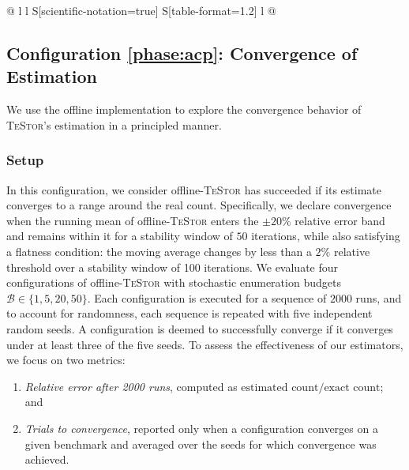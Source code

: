 \documentclass[acmsmall]{acmart}
\newcommand{\testor}{\textsc{TeStor}\xspace}
\begin{document}
\begin{table}[t]
\begin{tabular}{@{} l l S[scientific-notation=true] S[table-format=1.2] l @{}}
  \end{tabular}

  \vspace{0.1in}
  \caption{Synthetic benchmarks for estimator evaluation on \textbf{maximal executions}. Columns (left→right): benchmark info; estimator configuration; average relative error after 2000 trials; success ratio (fraction of 5 seeds that converge within the 80–120\% band); and average trials to converge across the successful seeds (reported only if success ratio$\geq 0.6$; otherwise shown as “failed”). }
    \label{tab:synthtic_converge}

\end{table}



\subsection{Configuration \ref{phase:acp}: Convergence of Estimation
}


We use the offline implementation to  explore the convergence behavior of \testor's estimation in a principled manner.

\subsubsection*{Setup}
In this configuration, we consider offline-\testor has succeeded if its estimate converges to a range around the real count. 
Specifically, we declare convergence when the running mean of offline-\testor enters the $\pm20\%$ relative error band and remains within it for a stability window of 
$50$ iterations, while also satisfying a flatness condition: the moving average changes by less than a $2\%$ relative threshold over a stability window of 100 iterations.
We evaluate four configurations of offline-\testor with stochastic enumeration budgets $\mathcal{B} \in \{1, 5, 20, 50\}$. 
Each configuration is executed for a sequence of $2000$ runs, and to account for randomness, each sequence is repeated with five independent random seeds. 
A configuration is deemed to successfully converge if it converges under at least three of the five seeds. 
To assess the effectiveness of our estimators, we focus on two metrics:
\begin{enumerate}
    \item \emph{Relative error after 2000 runs}, computed as $\text{estimated count} / \text{exact count}$; and
    \item \emph{Trials to convergence}, reported only when a configuration converges on a given benchmark and averaged over the seeds for which convergence was achieved.
\end{enumerate}
\end{document}
